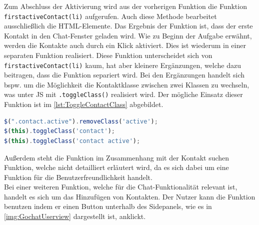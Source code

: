 \documentclass[a4paper,titlepage,halfparskip,12pt]{scrreprt}
\begin{document}
\begin{onehalfspacing}
Zum Abschluss der Aktivierung wird aus der vorherigen Funktion die Funktion \texttt{firstactiveContact(li)} aufgerufen. Auch diese Methode bearbeitet ausschließlich die \ac{HTML}-Elemente. Das Ergebnis der Funktion ist, dass der erste Kontakt in den Chat-Fenster geladen wird. Wie zu Beginn der Aufgabe erwähnt, werden die Kontakte auch durch ein Klick aktiviert. Dies ist wiederum in einer separaten Funktion realisiert. Diese Funktion unterscheidet sich von \texttt{firstactiveContact(li)} kaum, hat aber kleinere Ergänzungen, welche dazu beitragen, dass die Funktion separiert wird. Bei den Ergänzungen handelt sich bspw. um die Möglichkeit die Kontaktklasse zwischen zwei Klassen zu wechseln, was unter \ac{JS} mit \texttt{.toggleClass()} realisiert wird. Der mögliche Einsatz dieser Funktion ist im \autoref{lst:ToggleContactClass} abgebildet.
\begin{lstlisting}[language=Javascript,caption=Togglen der Klasse des ausgewählten Kontaktes,label={lst:ToggleContactClass}]
$(".contact.active").removeClass('active');
$(this).toggleClass('contact');
$(this).toggleClass('contact active');
\end{lstlisting}
Außerdem steht die Funktion im Zusammenhang mit der \glqq Kontakt suchen\grqq{} Funktion, welche nicht detailliert erläutert wird, da es sich dabei um eine Funktion für die Benutzerfreundlichkeit handelt.\\
Bei einer weiteren Funktion, welche für die Chat-Funktionalität relevant ist, handelt es sich um das Hinzufügen von Kontakten. Der Nutzer kann die Funktion benutzen indem er einen Button unterhalb des Sidepanels, wie es in \autoref{img:GochatUserview} dargestellt ist, anklickt.

\pagebreak


\end{onehalfspacing}
\end{document}

